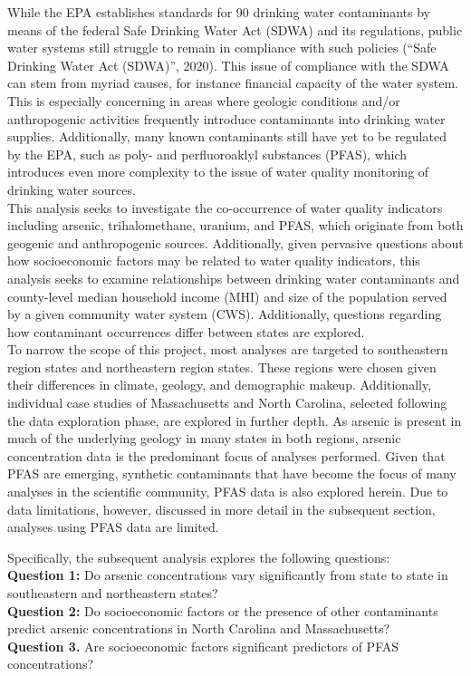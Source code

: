 \documentclass[12pt,]{article}
\begin{document}
While the EPA establishes standards for 90 drinking water contaminants
by means of the federal Safe Drinking Water Act (SDWA) and its
regulations, public water systems still struggle to remain in compliance
with such policies (``Safe Drinking Water Act (SDWA)'', 2020). This
issue of compliance with the SDWA can stem from myriad causes, for
instance financial capacity of the water system. This is especially
concerning in areas where geologic conditions and/or anthropogenic
activities frequently introduce contaminants into drinking water
supplies. Additionally, many known contaminants still have yet to be
regulated by the EPA, such as poly- and perfluoroaklyl substances
(PFAS), which introduces even more complexity to the issue of water
quality monitoring of drinking water sources.\\
This analysis seeks to investigate the co-occurrence of water quality
indicators including arsenic, trihalomethane, uranium, and PFAS, which
originate from both geogenic and anthropogenic sources. Additionally,
given pervasive questions about how socioeconomic factors may be related
to water quality indicators, this analysis seeks to examine
relationships between drinking water contaminants and county-level
median household income (MHI) and size of the population served by a
given community water system (CWS). Additionally, questions regarding
how contaminant occurrences differ between states are explored.\\
To narrow the scope of this project, most analyses are targeted to
southeastern region states and northeastern region states. These regions
were chosen given their differences in climate, geology, and demographic
makeup. Additionally, individual case studies of Massachusetts and North
Carolina, selected following the data exploration phase, are explored in
further depth. As arsenic is present in much of the underlying geology
in many states in both regions, arsenic concentration data is the
predominant focus of analyses performed. Given that PFAS are emerging,
synthetic contaminants that have become the focus of many analyses in
the scientific community, PFAS data is also explored herein. Due to data
limitations, however, discussed in more detail in the subsequent
section, analyses using PFAS data are limited.

Specifically, the subsequent analysis explores the following
questions:\\
\textbf{Question 1:} Do arsenic concentrations vary significantly from
state to state in southeastern and northeastern states?\\
\textbf{Question 2:} Do socioeconomic factors or the presence of other
contaminants predict arsenic concentrations in North Carolina and
Massachusetts?\\
\textbf{Question 3.} Are socioeconomic factors significant predictors of
PFAS concentrations?
\end{document}
